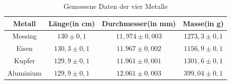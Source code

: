 \documentclass[a4paper, 11pt]{article}
\begin{document}
\begin{table}[H]
\centering
\renewcommand{\arraystretch}{1.2}
\begin{tabular}{|c|c|c|c|}
\hline Metall & Länge(in cm) & Durchmesser(in mm) & Masse(in g) \\
\hline Messing & $130 \pm 0,1$ &  $11,974 \pm 0,003$ & $1273,3 \pm 0,1$ \\
Eisen & $130,3 \pm 0,1$ &  $11.967 \pm 0,002$ & $1156,9 \pm 0,1$ \\
Kupfer & $129,9 \pm 0,1$ & $11.961 \pm 0,001$ & $1301,6 \pm 0,1$ \\
Aluminium & $129,9 \pm 0,1$ & $12.061 \pm 0,003$ & $399,04 \pm 0,1$ \\
\hline  
\end{tabular}
\caption{Gemessene Daten der vier Metalle}
\label{table:Metalldaten}
\end{table}
\end{document}
